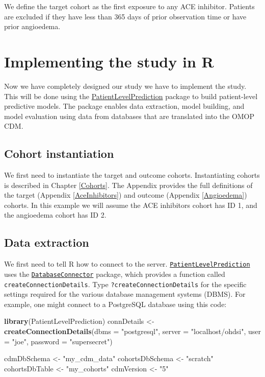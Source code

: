 \documentclass[11pt]{book}
\newenvironment{Shaded}{\begin{snugshade}}{\end{snugshade}}
\newcommand{\KeywordTok}[1]{\textcolor[rgb]{0.13,0.29,0.53}{\textbf{#1}}}
\newcommand{\DataTypeTok}[1]{\textcolor[rgb]{0.13,0.29,0.53}{#1}}
\newcommand{\StringTok}[1]{\textcolor[rgb]{0.31,0.60,0.02}{#1}}
\newcommand{\NormalTok}[1]{#1}
\begin{document}
We define the target cohort as the first exposure to any ACE inhibitor.
Patients are excluded if they have less than 365 days of prior
observation time or have prior angioedema.

\section{Implementing the study in R}\label{implementing-the-study-in-r}

Now we have completely designed our study we have to implement the
study. This will be done using the
\href{https://ohdsi.github.io/PatientLevelPrediction/}{PatientLevelPrediction}
package to build patient-level predictive models. The package enables
data extraction, model building, and model evaluation using data from
databases that are translated into the OMOP CDM.

\subsection{Cohort instantiation}\label{cohort-instantiation-1}

We first need to instantiate the target and outcome cohorts.
Instantiating cohorts is described in Chapter \ref{Cohorts}. The
Appendix provides the full definitions of the target (Appendix
\ref{AceInhibitors}) and outcome (Appendix \ref{Angioedema}) cohorts. In
this example we will assume the ACE inhibitors cohort has ID 1, and the
angioedema cohort has ID 2.

\subsection{Data extraction}\label{data-extraction-1}

We first need to tell R how to connect to the server.
\href{https://ohdsi.github.io/PatientLevelPrediction/}{\texttt{PatientLevelPrediction}}
uses the
\href{https://ohdsi.github.io/DatabaseConnector/}{\texttt{DatabaseConnector}}
package, which provides a function called
\texttt{createConnectionDetails}. Type \texttt{?createConnectionDetails}
for the specific settings required for the various database management
systems (DBMS). For example, one might connect to a PostgreSQL database
using this code:

\begin{Shaded}
\begin{Highlighting}[]
\KeywordTok{library}\NormalTok{(PatientLevelPrediction)}
\NormalTok{connDetails <-}\StringTok{ }\KeywordTok{createConnectionDetails}\NormalTok{(}\DataTypeTok{dbms =} \StringTok{"postgresql"}\NormalTok{,}
                                       \DataTypeTok{server =} \StringTok{"localhost/ohdsi"}\NormalTok{,}
                                       \DataTypeTok{user =} \StringTok{"joe"}\NormalTok{,}
                                       \DataTypeTok{password =} \StringTok{"supersecret"}\NormalTok{)}

\NormalTok{cdmDbSchema <-}\StringTok{ "my_cdm_data"}
\NormalTok{cohortsDbSchema <-}\StringTok{ "scratch"}
\NormalTok{cohortsDbTable <-}\StringTok{ "my_cohorts"}
\NormalTok{cdmVersion <-}\StringTok{ "5"}
\end{Highlighting}
\end{Shaded}
\end{document}
